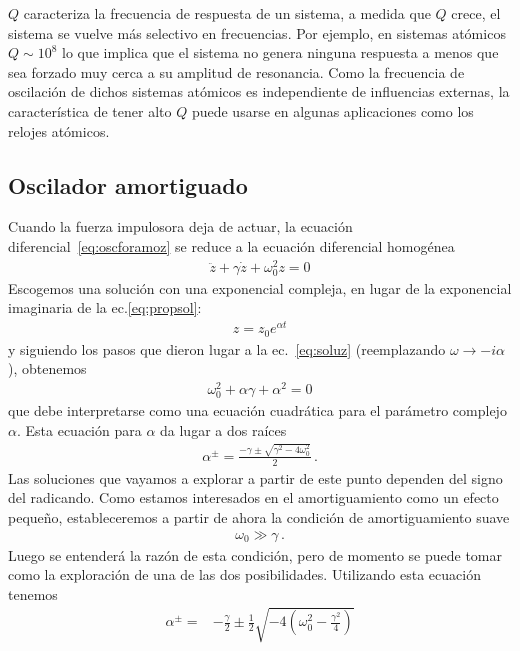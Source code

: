 $Q$ caracteriza la frecuencia de respuesta de un sistema, a medida que $Q$ crece, el sistema se vuelve más selectivo en frecuencias. Por ejemplo, en sistemas atómicos $Q\sim 10^8$ lo que implica que el sistema no genera ninguna respuesta a menos que sea forzado muy cerca a su amplitud de resonancia. Como la frecuencia de oscilación de dichos sistemas atómicos es independiente de influencias externas, la característica de tener alto $Q$ puede usarse en algunas aplicaciones como los relojes atómicos. 



\subsection{Oscilador amortiguado}
\begin{frame}
Cuando la fuerza impulosora deja de actuar, la ecuación diferencial~\eqref{eq:oscforamoz} se reduce a la ecuación diferencial homogénea
\begin{align*}
     \ddot z+\gamma \dot z+\omega_0^2 z=0
\end{align*}
Escogemos una solución con una exponencial compleja, en lugar de la exponencial imaginaria de la ec.\eqref{eq:propsol}:
\begin{align*}
  z=z_0 e^{\alpha t}
\end{align*}
y siguiendo los pasos que dieron lugar a la ec.~\eqref{eq:soluz} (reemplazando $\omega\to -i\alpha$), obtenemos
\begin{align*}
  \omega_0^2+\alpha \gamma+\alpha^2=0
\end{align*}
que debe interpretarse como una ecuación cuadrática para el parámetro complejo $\alpha$.
Esta ecuación para $\alpha$ da lugar a dos raíces
\begin{align*}
  \alpha^{\pm}=\frac{-\gamma\pm\sqrt{\gamma^2-4\omega_0^2}}{2}\,.
\end{align*}
Las soluciones que vayamos a explorar a partir de este punto dependen del signo del radicando. Como estamos interesados en el amortiguamiento como un efecto pequeño, estableceremos a partir de ahora la condición de amortiguamiento suave
\begin{align}
  \label{eq:12}
  \omega_0\gg \gamma\,.
\end{align}
Luego se entenderá la razón de esta condición, pero de momento se puede tomar como la exploración de una de las dos posibilidades. Utilizando esta ecuación tenemos
\begin{align}
  \alpha^{\pm}=&-\frac{\gamma}{2}\pm\frac{1}{2}\sqrt{-4 \left(\omega_0^2-\frac{\gamma^2}{4}\right)}\nonumber\\

\end{align}
\end{frame}
